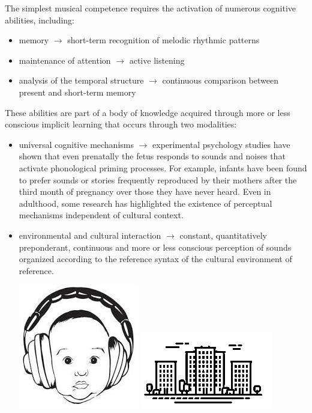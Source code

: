 The simplest musical competence requires the activation of numerous cognitive abilities, including: 

\begin{itemize}
\item memory \(\rightarrow\) short-term recognition of melodic rhythmic patterns
\item maintenance of attention \(\rightarrow\) active listening
\item analysis of the temporal structure \(\rightarrow\) continuous comparison between present and short-term memory
\end{itemize}

These abilities are part of a body of knowledge acquired through more or less conscious implicit learning that occurs through two modalities:

\begin{itemize}
\item universal cognitive mechanisms \(\rightarrow\) experimental psychology studies have shown that even prenatally the fetus responds to sounds and noises that activate phonological priming processes. For example, infants have been found to prefer sounds or stories frequently reproduced by their mothers after the third month of pregnancy over
those they have never heard. Even in adulthood, some research has highlighted the existence of perceptual mechanisms independent of cultural context.

\item environmental and cultural interaction \(\rightarrow\) constant, quantitatively preponderant, continuous and more or less conscious perception of sounds organized according to the reference syntax of the cultural environment of reference.
  
\begin{center}
\includegraphics[scale=0.28]{../img/prenatale.png}
\includegraphics[scale=0.55]{../img/metro.png}
\end{center}
\end{itemize}

